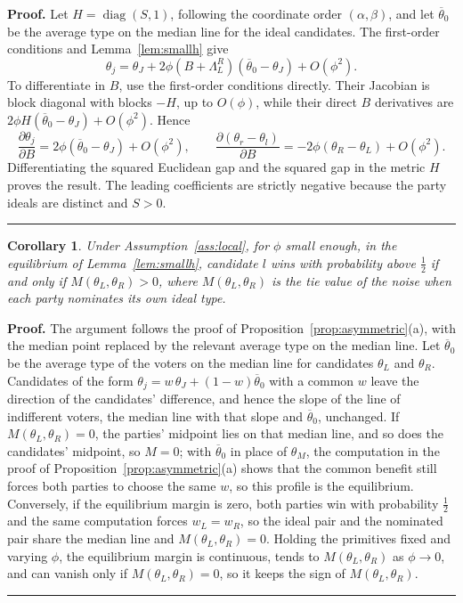 \documentclass[12pt,letterpaper]{article}
\newtheorem{corollary}{Corollary}
\newenvironment{proof}[1][Proof]{\noindent\textbf{#1.} }{\ \rule{0.5em}{0.5em}}
\begin{document}
\begin{proof}
Let $H=\operatorname{diag}(S,1)$, following the coordinate order $(\alpha,\beta)$, and let $\overline{\theta}_0$ be the average type on the median line for the ideal candidates. The first-order conditions and Lemma~\ref{lem:smallh} give
\[
\theta_j=\theta_J+2\phi(B+\Lambda_L^R)(\overline{\theta}_0-\theta_J)+O(\phi^2).
\]
To differentiate in $B$, use the first-order conditions directly. Their Jacobian is block diagonal with blocks $-H$, up to $O(\phi)$, while their direct $B$ derivatives are $2\phi H(\overline{\theta}_0-\theta_J)+O(\phi^2)$. Hence
\[
\frac{\partial\theta_j}{\partial B}=2\phi(\overline{\theta}_0-\theta_J)+O(\phi^2),
\qquad
\frac{\partial(\theta_r-\theta_l)}{\partial B}=-2\phi(\theta_R-\theta_L)+O(\phi^2).
\]
Differentiating the squared Euclidean gap and the squared gap in the metric $H$ proves the result. The leading coefficients are strictly negative because the party ideals are distinct and $S>0$.
\end{proof}

\begin{corollary}\label{cor:leadgeneral}
Under Assumption~\ref{ass:local}, for $\phi$ small enough, in the equilibrium of Lemma~\ref{lem:smallh}, candidate $l$ wins with probability above $\tfrac12$ if and only if $M(\theta_L,\theta_R)>0$, where $M(\theta_L,\theta_R)$ is the tie value of the noise when each party nominates its own ideal type.
\end{corollary}

\begin{proof}
The argument follows the proof of Proposition~\ref{prop:asymmetric}(a), with the median point replaced by the relevant average type on the median line. Let $\overline{\theta}_0$ be the average type of the voters on the median line for candidates $\theta_L$ and $\theta_R$. Candidates of the form $\theta_j=w\,\theta_J+(1-w)\overline{\theta}_0$ with a common $w$ leave the direction of the candidates' difference, and hence the slope of the line of indifferent voters, the median line with that slope and $\overline{\theta}_0$, unchanged. If $M(\theta_L,\theta_R)=0$, the parties' midpoint lies on that median line, and so does the candidates' midpoint, so $M=0$; with $\overline{\theta}_0$ in place of $\theta_M$, the computation in the proof of Proposition~\ref{prop:asymmetric}(a) shows that the common benefit still forces both parties to choose the same $w$, so this profile is the equilibrium. Conversely, if the equilibrium margin is zero, both parties win with probability $\tfrac12$ and the same computation forces $w_L=w_R$, so the ideal pair and the nominated pair share the median line and $M(\theta_L,\theta_R)=0$. Holding the primitives fixed and varying $\phi$, the equilibrium margin is continuous, tends to $M(\theta_L,\theta_R)$ as $\phi\to0$, and can vanish only if $M(\theta_L,\theta_R)=0$, so it keeps the sign of $M(\theta_L,\theta_R)$.
\end{proof}
\end{document}

